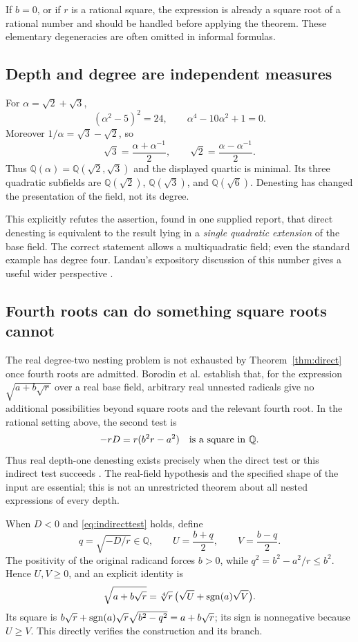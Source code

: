 \documentclass[11pt,a4paper]{article}
\numberwithin{equation}{section}
\theoremstyle{definition}\newtheorem{definition}[theorem]{Definition}
\theoremstyle{remark}\newtheorem{remark}[theorem]{Remark}
\newcommand{\Q}{\mathbb Q}\newcommand{\R}{\mathbb R}\newcommand{\C}{\mathbb C}\newcommand{\Z}{\mathbb Z}
\begin{document}
If $b=0$, or if $r$ is a rational square, the expression is already a square root of a rational number and should be handled before applying the theorem. These elementary degeneracies are often omitted in informal formulas.

\subsection{Depth and degree are independent measures}
For $\alpha=\sqrt2+\sqrt3$,
\[
(\alpha^2-5)^2=24,
\qquad \alpha^4-10\alpha^2+1=0.
\]
Moreover $1/\alpha=\sqrt3-\sqrt2$, so
\[
\sqrt3=\frac{\alpha+\alpha^{-1}}2,
\qquad
\sqrt2=\frac{\alpha-\alpha^{-1}}2.
\]
Thus $\Q(\alpha)=\Q(\sqrt2,\sqrt3)$ and the displayed quartic is minimal. Its three quadratic subfields are $\Q(\sqrt2)$, $\Q(\sqrt3)$, and $\Q(\sqrt6)$. Denesting has changed the presentation of the field, not its degree.

This explicitly refutes the assertion, found in one supplied report, that direct denesting is equivalent to the result lying in a \emph{single quadratic extension} of the base field. The correct statement allows a multiquadratic field; even the standard example has degree four. Landau's expository discussion of this number gives a useful wider perspective \cite{landau98}.

\subsection{Fourth roots can do something square roots cannot}
The real degree-two nesting problem is not exhausted by Theorem~\ref{thm:direct} once fourth roots are admitted. Borodin et al. establish that, for the expression $\sqrt{a+b\sqrt r}$ over a real base field, arbitrary real unnested radicals give no additional possibilities beyond square roots and the relevant fourth root. In the rational setting above, the second test is
\begin{equation}\label{eq:indirecttest}
-rD=r(b^2r-a^2)\quad\hbox{is a square in }\Q.
\end{equation}
Thus real depth-one denesting exists precisely when the direct test or this indirect test succeeds \cite{bfht,gkioulekas}. The real-field hypothesis and the specified shape of the input are essential; this is not an unrestricted theorem about all nested expressions of every depth.

When $D<0$ and \eqref{eq:indirecttest} holds, define
\[
q=\sqrt{-D/r}\in\Q,\qquad
U=\frac{b+q}{2},\qquad V=\frac{b-q}{2}.
\]
The positivity of the original radicand forces $b>0$, while $q^2=b^2-a^2/r\le b^2$. Hence $U,V\ge0$, and an explicit identity is
\begin{equation}\label{eq:indirect}
\sqrt{a+b\sqrt r}=\sqrt[4]r\,\bigl(\sqrt U+\operatorname{sgn}(a)\sqrt V\bigr).
\end{equation}
Its square is $b\sqrt r+\operatorname{sgn}(a)\sqrt r\sqrt{b^2-q^2}=a+b\sqrt r$; its sign is nonnegative because $U\ge V$. This directly verifies the construction and its branch.
\end{document}
